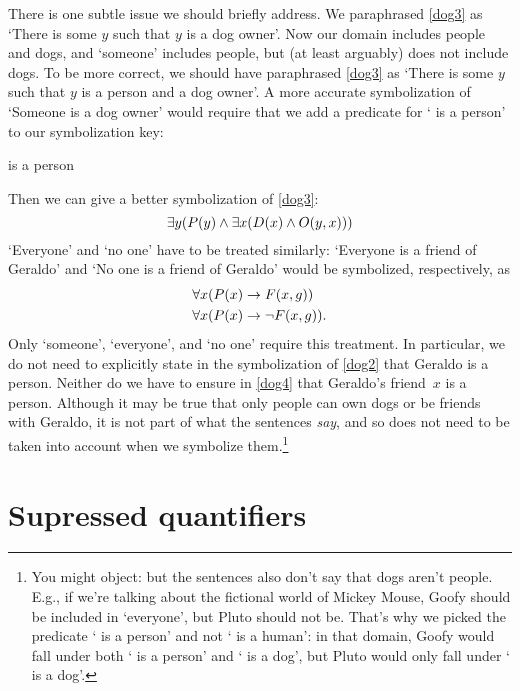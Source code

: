 There is one subtle issue we should briefly address. We paraphrased
\cref{dog3} as `There is some $y$ such that $y$ is a dog owner'.
Now our domain includes people and dogs, and `someone' includes
people, but (at least arguably) does not include dogs.  To be more
correct, we should have paraphrased \cref*{dog3} as `There is
some $y$ such that $y$ is a person and a dog owner'. A more accurate
symbolization of `Someone is a dog owner' would require that we add a
predicate for `\blank{} is a person' to our symbolization key:
\begin{ekey}
	\item[\atom{P}{x}]  is a person
\end{ekey}
Then we can give a better symbolization of \cref{dog3}:
$$\exists y (P(y) \wedge \exists x(D(x) \wedge
O(y,x)))$$
`Everyone' and `no one' have to be treated similarly: `Everyone
is a friend of Geraldo' and `No one is a friend of Geraldo' would be
symbolized, respectively, as
\begin{align*}
	& \forall x(P(x) \rightarrow F(x,g))\\
	& \forall x(P(x) \rightarrow \neg F(x,g)).
\end{align*}
Only `someone', `everyone', and `no one' require this treatment. In
particular, we do not need to explicitly state in the symbolization of
\cref{dog2} that Geraldo is a person. Neither do we have to
ensure in \cref{dog4} that Geraldo's friend~$x$ is a person.
Although it may be true that only people can own dogs or be friends
with Geraldo, it is not part of what the sentences \emph{say}, and so
does not need to be taken into account when we symbolize
them.\footnote{You might object: but the sentences also don't say that
dogs aren't people. E.g., if we're talking about the fictional world
of Mickey Mouse, Goofy should be included in `everyone', but Pluto
should not be.  That's why we picked the predicate `\blank{} is a
person' and not `\blank{} is a human': in that domain, Goofy would
fall under both `\blank{} is a person' and `\blank{} is a dog', but
Pluto would only fall under `\blank{} is a dog'.}

\section{Supressed quantifiers}\label{ss:SuppQuant}

